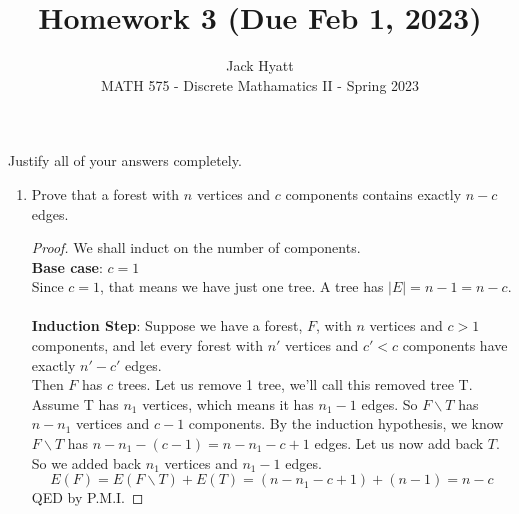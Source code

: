 \documentclass[12pt]{article}
\begin{document}
	
	
	
	\title{Homework 3 (Due Feb 1, 2023)}
	\author{Jack Hyatt\\ %
		MATH 575 - Discrete Mathamatics II - Spring 2023} 
	
	\maketitle
	
	Justify all of your answers completely.\\
	
	
	\medskip 

\begin{enumerate}

\item Prove that a forest with $n$ vertices and $c$ components contains exactly $n-c$ edges.

\begin{proof}
	We shall induct on the number of components.\\
	\textbf{Base case}: $c=1$\\
	Since $c=1$, that means we have just one tree. A tree has $|E| = n-1 = n-c$.\\\\
	\textbf{Induction Step}: Suppose we have a forest, $F$, with $n$ vertices and $c>1$ components, and let every forest with $n'$ vertices and $c'<c$ components have exactly $n'-c'$ edges.\\
	Then $F$ has $c$ trees. Let us remove 1 tree, we'll call this removed tree T. Assume T has $n_1$ vertices, which means it has $n_1-1$ edges. So $F\backslash T$ has $n-n_1$ vertices and $c-1$ components. By the induction hypothesis, we know $F\backslash T$ has $n-n_1-(c-1) = n-n_1-c+1$ edges. Let us now add back $T$. So we added back $n_1$ vertices and $n_1-1$ edges.
	\[E(F) = E(F\backslash T) + E(T) = (n-n_1-c+1) + (n-1) = n-c\]
	QED by P.M.I.
\end{proof}


\medskip 


\end{enumerate}
\end{document}
